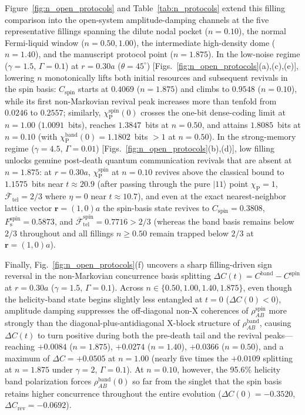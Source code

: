 \documentclass[aps,prb,twocolumn,superscriptaddress,longbibliography]{revtex4-2}
\begin{document}
Figure~\ref{fig:n_open_protocols} and Table~\ref{tab:n_protocols} extend
this filling comparison into the open-system amplitude-damping channels
at the five representative fillings spanning the dilute nodal pocket
($n=0.10$), the normal Fermi-liquid window ($n=0.50,1.00$), the
intermediate high-density dome ($n=1.40$), and the manuscript protocol
point ($n=1.875$). In the low-noise regime ($\gamma=1.5$, $\Gamma=0.1$)
at $r=0.30a$ ($\theta=45^\circ$) [Figs.~\ref{fig:n_open_protocols}(a),(c),(e)],
lowering $n$ monotonically lifts both initial resources and subsequent
revivals in the spin basis: $C_{\mathrm{spin}}$ starts at $0.4069$
($n=1.875$) and climbs to $0.9548$ ($n=0.10$), while its first
non-Markovian revival peak increases more than tenfold from $0.0246$ to
$0.2557$; similarly, $\chi_{\mathrm{P}}^{\mathrm{spin}}(0)$ crosses the
one-bit dense-coding limit at $n=1.00$ ($1.0091$~bits), reaches
$1.3847$~bits at $n=0.50$, and attains $1.8085$~bits at $n=0.10$ (with
$\chi_{\mathrm{P}}^{\mathrm{band}}(0)=1.1802$~bits $>1$ at $n=0.50$).
In the strong-memory regime ($\gamma=4.5$, $\Gamma=0.01$)
[Figs.~\ref{fig:n_open_protocols}(b),(d)], low filling unlocks genuine
post-death quantum communication revivals that are absent at $n=1.875$:
at $r=0.30a$, $\chi_{\mathrm{P}}^{\mathrm{spin}}$ at $n=0.10$ revives
above the classical bound to $1.1575$~bits near $t\approx 20.9$ (after
passing through the pure $|11\rangle$ point $\chi_{\mathrm{P}}=1$,
$\overline{\mathcal{F}}_{\mathrm{tel}}=2/3$ where $\eta=0$ near $t\approx 10.7$),
and even at the exact nearest-neighbor lattice vector $\mathbf{r}=(1,0)a$
the spin-basis state revives to $C_{\mathrm{spin}}=0.3808$,
$F_{\mathrm{s}}^{\mathrm{spin}}=0.5873$, and
$\overline{\mathcal{F}}_{\mathrm{tel}}^{\mathrm{spin}}=0.7716>2/3$
(whereas the band basis remains below $2/3$ throughout and all fillings
$n\ge 0.50$ remain trapped below $2/3$ at $\mathbf{r}=(1,0)a$).

Finally, Fig.~\ref{fig:n_open_protocols}(f) uncovers a sharp filling-driven
sign reversal in the non-Markovian concurrence basis splitting
$\Delta C(t)=C^{\mathrm{band}}-C^{\mathrm{spin}}$ at $r=0.30a$
($\gamma=1.5$, $\Gamma=0.1$). Across $n\in\{0.50,1.00,1.40,1.875\}$,
even though the helicity-band state begins slightly less entangled at
$t=0$ ($\Delta C(0)<0$), amplitude damping suppresses the off-diagonal
non-X coherences of $\rho_{AB}^{\mathrm{spin}}$ more strongly than the
diagonal-plus-antidiagonal X-block structure of $\rho_{AB}^{\mathrm{band}}$,
causing $\Delta C(t)$ to turn positive during both the pre-death tail and
the revival peaks—reaching $+0.0084$ ($n=1.875$), $+0.0274$ ($n=1.40$),
$+0.0366$ ($n=0.50$), and a maximum of $\Delta C = +0.0505$ at $n=1.00$
(nearly five times the $+0.0109$ splitting at $n=1.875$ under $\gamma=2$,
$\Gamma=0.1$). At $n=0.10$, however, the 95.6\% helicity band
polarization forces $\rho_{AB}^{\mathrm{band}}(0)$ so far from the
singlet that the spin basis retains higher concurrence throughout the
entire evolution ($\Delta C(0)=-0.3520$, $\Delta C_{\mathrm{rev}}=-0.0692$).
\end{document}

